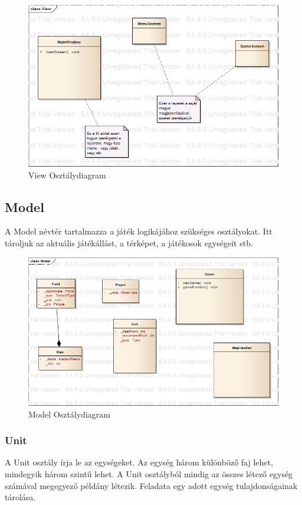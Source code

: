 \documentclass[a4paper,12pt]{report}
\begin{document}
\begin{figure}[hbtp]
\centering
\includegraphics[width=1\textwidth]{ViewClass.png}
\caption{View Osztálydiagram}
\label{fig:vc}
\end{figure}

\subsection{Model}

A Model névtér tartalmazza a játék logikájához szükséges osztályokat. Itt tároljuk az aktuális játékállást, a térképet, a játékosok egységeit stb.

\begin{figure}[hbtp]
\centering
\includegraphics[width=1\textwidth]{ModelClass.png}
\caption{Model Osztálydiagram}
\label{fig:mc}
\end{figure}

\subsubsection{Unit}
A Unit osztály írja le az egységeket. Az egység három különböző faj lehet, mindegyik három szintű lehet. A Unit osztályból mindig az összes létező egység számával megegyező példány létezik. Feladata egy adott egység tulajdonságainak tárolása.
\end{document}
